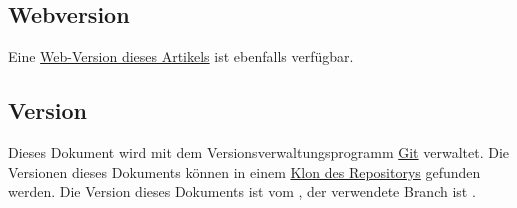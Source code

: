 \subsection{Webversion}
Eine \href{http://blog.kreuvf.de//dsa-regeln-fur-viertelzauberer/}{Web-Version dieses Artikels} ist ebenfalls verfügbar.

\subsection{Version}
Dieses Dokument wird mit dem Versionsverwaltungsprogramm \href{http://git-scm.com/}{Git} verwaltet. Die Versionen dieses Dokuments können in einem \href{https://github.com/kreuvf/dsa-regeln-viertelzauberer}{Klon des Repositorys} gefunden werden. Die Version dieses Dokuments ist \gitAbbrevHash{} vom \gitAuthorIsoDate, der verwendete Branch ist \gitBranch.